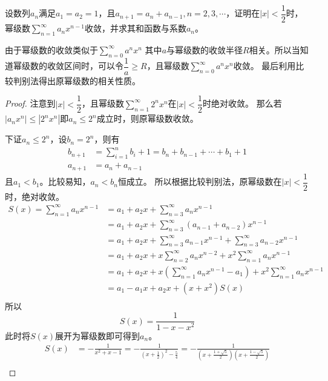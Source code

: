 \begin{example}
    设数列${a_n}$满足$a_1=a_2=1$，且$a_{n+1}=a_n+a_{n-1}, n=2,3,\cdots$，证明在$|x|<\dfrac{1}{2}$时，
    幂级数$\displaystyle\sum_{n=1}^\infty a_nx^{n-1}$收敛，并求其和函数与系数$a_n$。
\end{example}
由于幂级数的收敛类似于$\displaystyle\sum_{n=0}^\infty a^nx^n$
其中$a$与幂级数的收敛半径$R$相关。所以当知道幂级数的收敛区间时，可以令$\dfrac{1}{a}\geq R$，且幂级数$\displaystyle\sum_{n=0}^\infty a^nx^n$收敛。
最后利用比较判别法得出原幂级数的相关性质。
\begin{proof}
    注意到$|x|<\dfrac{1}{2}$，且幂级数$\displaystyle\sum_{n=1}^\infty 2^nx^n$在$|x|<\dfrac{1}{2}$时绝对收敛。
    那么若$|a_n x^n| \leq |2^n x^n|$即$a_n\leq 2^n$成立时，则原幂级数收敛。

    下证$a_n\leq 2^n$，设$b_n=2^n$，则有
    \begin{align*}
        b_{n+1} & = \sum_{i=1}^{n}b_i +1 = b_n + b_{n-1} + \cdots + b_1 + 1 \\
        a_{n+1} & = a_{n} + a_{n-1}
    \end{align*}
    且$a_1 < b_1$。比较易知，$a_{n}<b_{n}$恒成立。
    所以根据比较判别法，原幂级数在$|x|<\dfrac{1}{2}$时，绝对收敛。
    \begin{align*}
        S(x) = \sum_{n=1}^\infty a_nx^{n-1}
         & = a_1 + a_2x + \sum_{n=3}^\infty a_nx^{n-1}                                          \\
         & = a_1 +a_2x +\sum_{n=3}^\infty (a_{n-1}+a_{n-2})x^{n-1}                              \\
         & = a_1 +a_2x +\sum_{n=3}^\infty a_{n-1}x^{n-1} + \sum_{n=3}^\infty a_{n-2}x^{n-1}     \\
         & = a_1 +a_2x +x\sum_{n=2}^\infty a_nx^{n-2} + x^2\sum_{n=1}^\infty a_nx^{n-1}         \\
         & = a_1 +a_2x +x(\sum_{n=1}^\infty a_nx^{n-1} - a_1) + x^2\sum_{n=1}^\infty a_nx^{n-1} \\
         & = a_1 - a_1x +a_2x + (x + x^2)S(x)                                                   \\
    \end{align*}
    所以
    \[ S(x) = \frac{1}{1-x-x^2} \]
    此时将$S(x)$展开为幂级数即可得到$a_n$。
    \begin{align*}
        S(x)
         &
        = -\frac{1}{x^2+x-1}
        = -\frac{1}{\left(x+\frac{1}{2}\right)^2-\frac{5}{4}}
        = -\frac{1}{\left(x+\frac{1+\sqrt{5}}{2}\right)\left(x+\frac{1-\sqrt{5}}{2}\right)}                                                                   \\

\end{align*}
\end{proof}

